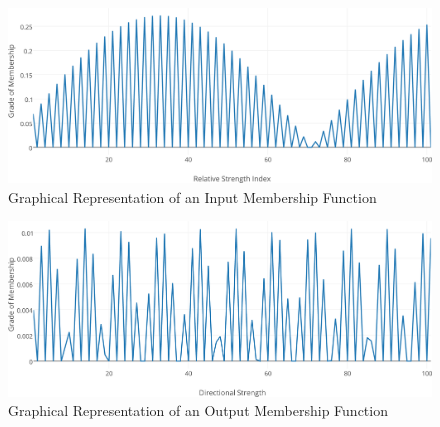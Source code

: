 \documentclass[a4paper,twoside]{article}
\begin{document}
\begin{figure}[h!]
\begin{center}
\includegraphics[width=1.00\columnwidth]{figures/mf-input/mf-input}
\caption{{\label{input-mf}Graphical Representation of an Input Membership Function%
}}
\end{center}
\end{figure}

\begin{figure}[h!]
\begin{center}
\includegraphics[width=1.00\columnwidth]{figures/mf-output/mf-output}
\caption{{\label{output-mf}Graphical Representation of an Output Membership Function%
}}
\end{center}
\end{figure}
\end{document}
